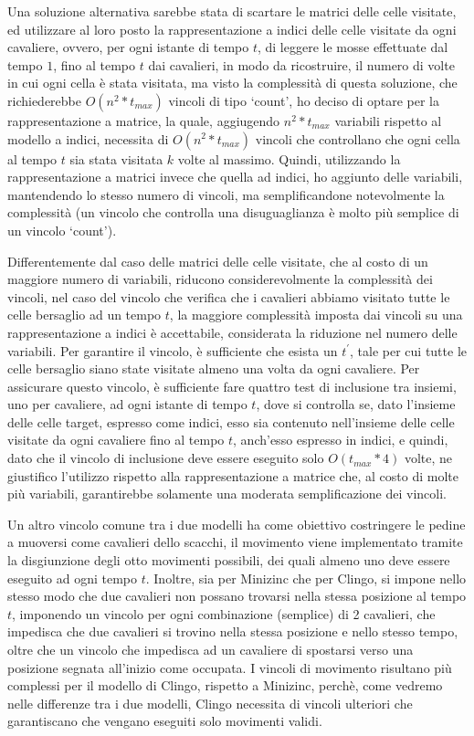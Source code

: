 \documentclass[12pt]{article}
\begin{document}
Una soluzione alternativa sarebbe stata di scartare le matrici delle celle visitate, ed utilizzare al loro posto la rappresentazione a indici delle celle visitate da ogni cavaliere, ovvero, per ogni istante di tempo $t$, di leggere le mosse effettuate dal tempo $1$, fino al tempo $t$ dai cavalieri, in modo da ricostruire, il 
numero di volte in cui ogni cella è stata visitata, ma visto la complessità di questa soluzione, che richiederebbe $O(n^2*t_{max})$ vincoli di tipo ‘count’, ho deciso di optare per la rappresentazione a matrice, la quale, aggiugendo $n^2 * t_{max}$ variabili rispetto al modello a indici, necessita di $O(n^2*t_{max})$ vincoli che controllano che ogni cella al tempo $t$ sia stata visitata $k$ volte al massimo. 
Quindi, utilizzando la rappresentazione a matrici invece che quella ad indici, ho aggiunto delle variabili, mantendendo lo stesso numero di vincoli, ma semplificandone notevolmente la complessità (un vincolo che controlla una disuguaglianza è molto più semplice di un vincolo ‘count’).

Differentemente dal caso delle matrici delle celle visitate, che al costo di un maggiore numero di variabili, riducono considerevolmente la complessità dei vincoli, nel caso del vincolo che verifica che i cavalieri abbiamo visitato tutte le celle bersaglio ad un tempo $t$, 
la maggiore complessità imposta dai vincoli su una rappresentazione a indici è accettabile, considerata la riduzione nel numero delle variabili.
 Per garantire il vincolo, è sufficiente che esista un $t^{'}$, tale per cui tutte le celle bersaglio siano state visitate almeno una volta da ogni cavaliere. Per assicurare questo vincolo, è sufficiente fare quattro test di inclusione tra insiemi, uno per cavaliere, ad ogni istante di tempo $t$, dove si controlla se, 
dato l'insieme delle celle target, espresso come indici, esso sia contenuto nell'insieme delle celle visitate da ogni cavaliere fino al tempo $t$, anch'esso espresso in indici, e quindi, dato che il vincolo di inclusione deve essere eseguito solo $O(t_{max}*4)$ volte, ne giustifico 
l'utilizzo rispetto alla rappresentazione a matrice che, al costo di molte più variabili, garantirebbe solamente una moderata semplificazione dei vincoli.

Un altro vincolo comune tra i due modelli ha come obiettivo costringere le pedine a muoversi come cavalieri dello scacchi, il movimento viene implementato tramite la disgiunzione degli otto movimenti possibili, dei quali almeno uno deve essere eseguito ad ogni tempo $t$.  
Inoltre, sia per Minizinc che per Clingo, si impone nello stesso modo che due cavalieri non possano trovarsi nella stessa posizione al tempo $t$, imponendo un vincolo per ogni combinazione (semplice) di 2 cavalieri, che impedisca che due cavalieri si trovino nella stessa posizione e nello stesso tempo, oltre che un vincolo che 
impedisca ad un cavaliere di spostarsi verso una posizione segnata all'inizio come occupata. 
I vincoli di movimento risultano più complessi per il modello di Clingo, rispetto a Minizinc, perchè, come vedremo nelle differenze tra i due modelli, Clingo necessita di vincoli ulteriori che garantiscano che vengano eseguiti solo movimenti validi.
\end{document}
